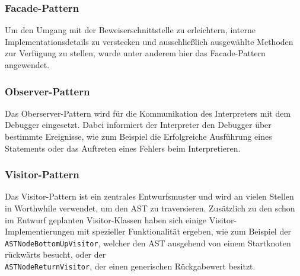 \subsubsection{Facade-Pattern}
Um den Umgang mit der Beweiserschnittstelle zu erleichtern, interne Implementationsdetails zu verstecken und ausschließlich ausgewählte Methoden zur Verfügung zu stellen, wurde unter anderem hier das Facade-Pattern angewendet.

\subsubsection{Observer-Pattern}
Das Oberserver-Pattern wird für die Kommunikation des Interpreters mit dem Debugger eingesetzt. Dabei informiert der Interpreter den Debugger über bestimmte Ereignisse, wie zum Beispiel die Erfolgreiche Ausführung eines Statements oder das Auftreten eines Fehlers beim Interpretieren.

\subsubsection{Visitor-Pattern}
Das Visitor-Pattern ist ein zentrales Entwurfsmuster und wird an vielen Stellen in Worthwhile verwendet, um den AST zu traversieren. Zusätzlich zu den schon im Entwurf geplanten Visitor-Klassen haben sich einige Visitor-Implementierungen mit spezieller Funktionalität ergeben, wie zum Beispiel der \texttt{ASTNodeBottomUpVisitor}, welcher den AST ausgehend von einem Startknoten rückwärts besucht, oder der \\ \texttt{ASTNodeReturnVisitor}, der einen generischen Rückgabewert besitzt.

